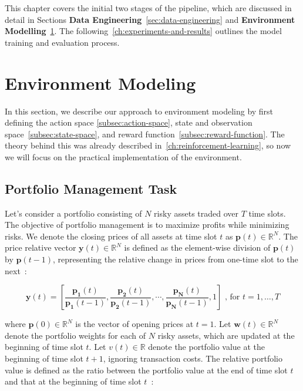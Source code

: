 \documentclass[../xlapes02]{subfiles}
\begin{document}
    This chapter covers the initial two stages of the pipeline, which are discussed in detail in Sections \textbf{Data Engineering}~\cref{sec:data-engineering} and \textbf{Environment Modelling}~\cref{sec:environment-modeling}. The following~\cref{ch:experiments-and-results} outlines the model training and evaluation process.


    \section{Environment Modeling}\label{sec:environment-modeling}
    In this section, we describe our approach to environment modeling by first defining the action space \cref{subsec:action-space}, state and observation space~\cref{subsec:state-space}, and reward function~\cref{subsec:reward-function}. The theory behind this was already described in~\cref{ch:reinforcement-learning}, so now we will focus on the practical implementation of the environment.

    \subsection{Portfolio Management Task}\label{sec:portfolio-management-task}
    Let's consider a portfolio consisting of $N$ risky assets traded over $T$ time slots. The objective of portfolio management is to maximize profits while minimizing risks. We denote the closing prices of all assets at time slot $t$ as $\mathbf{p}(t) \in \mathbb{R}^N$. The price relative vector $\mathbf{y}(t) \in \mathbb{R}^N$ is defined as the element-wise division of $\mathbf{p}(t)$ by $\mathbf{p}(t-1)$, representing the relative change in prices from one-time slot to the next~\cite{finrl-portfolio-allocation-2020}:

    \begin{equation}
        \mathbf{y}(t)=\left[\frac{\mathbf{p_1}(t)}{\mathbf{p_1}(t-1)}, \frac{\mathbf{p_2}(t)}{\mathbf{p_2}(t-1)}, \cdots, \frac{\mathbf{p_N}(t)}{\mathbf{p_N}(t-1)}, 1\right]\text{ , for }t=1,\ldots,T
    \end{equation}

    where $\mathbf{p}(0) \in \mathbb{R}^N$ is the vector of opening prices at $t = 1$. Let $\mathbf{w}(t) \in \mathbb{R}^N$ denote the portfolio weights for each of $N$ risky assets, which are updated at the beginning of time slot $t$. Let $v(t) \in \mathbb{R}$ denote the portfolio value at the beginning of time slot $t+1$, ignoring transaction costs. The relative portfolio value is defined as the ratio between the portfolio value at the end of time slot $t$ and that at the beginning of time slot $t$~\cite{finrl-portfolio-allocation-2020}:
\end{document}
